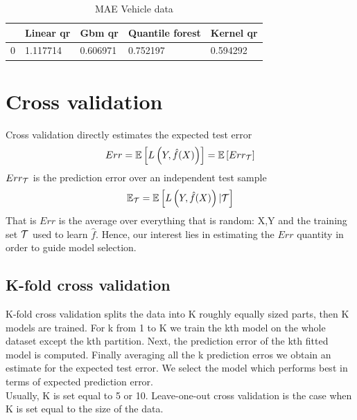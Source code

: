 \begin{table}
    \caption{MAE Vehicle data}
    \begin{tabular}{lllll}
    \toprule
     & Linear qr & Gbm qr & Quantile forest & Kernel qr \\
    \midrule
    0 & 1.117714 & 0.606971 & 0.752197 & 0.594292 \\
    \bottomrule
    \end{tabular}
\end{table}
    

\section{Cross validation}
Cross validation directly estimates the expected test error
\begin{equation}
    Err=\mathbb{E}\left[L\left(Y,\hat{f}(X)\right)\right]=\mathbb{E}\left[Err_{\mathcal{T}}\right]
\end{equation}
$Err_{\mathcal{T}}$ is the prediction error over an independent test sample
\begin{equation}
    \mathbb{E}_{\mathcal{T}}=\mathbb{E}\left[L\left(Y,\hat{f}(X)\right)| \mathcal{T} \right]
\end{equation}
That is $Err$ is the average over everything that is random: X,Y and the training set $\mathcal{T}$ used to learn $\hat{f}$. Hence, our interest lies in estimating the $Err$ quantity in order to guide model selection.
\subsection{K-fold cross validation}
K-fold cross validation splits the data into K roughly equally sized parts, then K models are trained. For k from 1 to K we train the kth model on the whole dataset except the kth partition. Next,  the prediction error of the kth fitted model is computed. Finally averaging all the k prediction erros we obtain an estimate for the expected test error. We select the model which performs best in terms of expected prediction error.
\\
Usually, K is set equal to 5 or 10. Leave-one-out cross validation is the case when K is set equal to the size of the data.
